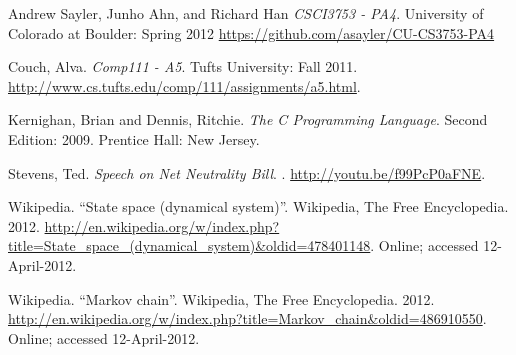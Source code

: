 \documentclass[12pt]{article}
\begin{document}
\begin{thebibliography}{3}

 Andrew Sayler, Junho Ahn, and Richard Han
  \newblock \emph{CSCI3753 - PA4}.
  \newblock University of Colorado at Boulder: Spring 2012
  \newblock \url{https://github.com/asayler/CU-CS3753-PA4}

 Couch, Alva.
  \newblock \emph{Comp111 - A5}.
  \newblock Tufts University: Fall 2011.
  \newblock \url{http://www.cs.tufts.edu/comp/111/assignments/a5.html}.

 Kernighan, Brian and Dennis, Ritchie.
  \newblock \emph{The C Programming Language}.
  \newblock Second Edition: 2009.
  \newblock Prentice Hall: New Jersey.

 Stevens, Ted.
  \newblock \emph{Speech on Net Neutrality Bill}.
  .
  \newblock \url{http://youtu.be/f99PcP0aFNE}.

 Wikipedia.
  \newblock ``State space (dynamical system)''.
  \newblock Wikipedia, The Free Encyclopedia. 2012.
  \newblock
  \url{http://en.wikipedia.org/w/index.php?title=State_space_(dynamical_system)&oldid=478401148}.
  \newblock Online; accessed 12-April-2012.

 Wikipedia.
  \newblock ``Markov chain''.
  \newblock Wikipedia, The Free Encyclopedia. 2012.
  \newblock
  \url{http://en.wikipedia.org/w/index.php?title=Markov_chain&oldid=486910550}.
  \newblock Online; accessed 12-April-2012.

\end{thebibliography}
\end{document}
